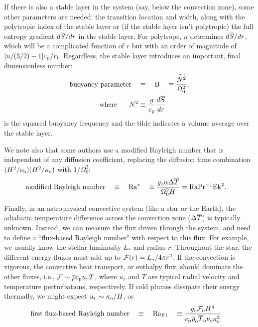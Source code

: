 \documentclass[12pt]{article} %
\begin{document}
If there is also a stable layer in the system (say, below the convection zone), some other parameters are needed: the transition location and width, along with the polytropic index of the stable layer or (if the stable layer isn't polytropic) the full entropy gradient $d\overline{S}/dr$ in the stable layer. For polytrope, $n$ determines $d\overline{S}/dr$, which will be a complicated function of $r$ but with an order of magnitude of $[n/(3/2)-1]c_{\rm{p}}/r_{\rm{i}}$. Regardless, the stable layer introduces an important, final dimensionless number:
\begin{align}
	\text{buoyancy parameter}\quad & \equiv \quad {\rm{B}} \quad \equiv \frac{\widetilde{N^2}}{\Omega_0^2},\\
	\text{where}\ \ \ \ \  N^2 &\equiv \frac{g}{c_{\rm{p}}}\frac{d\overline{S}}{dr}
\end{align}
is the squared buoyancy frequency and the tilde indicates a volume average over the stable layer. 

We note also that some authors use a modified Rayleigh number that is independent of any diffusion coefficient, replacing the diffusion time combination $(H^2/\nu_{\rm{o}})(H^2/\kappa_{\rm{o}})$ with $1/\Omega_0^2$:
\begin{align}
		\text{modified Rayleigh number} \quad & \equiv \quad {\rm{Ra^*}} \quad \equiv \frac{g_{\rm{o}}\alpha\Delta\overline{T} }{\Omega_0^2H}=\rm{Ra Pr^{-1} Ek^2}.
\end{align}

Finally, in an astrophysical convective system (like a star or the Earth), the adiabatic temperature difference across the convection zone ($\Delta\overline{T}$) is typically unknown. Instead, we can measure the flux driven through the system, and need to define a ``flux-based Rayleigh number" with respect to this flux. For example, we usually know the stellar luminosity $L_*$ and radius $r$. Throughout the star, the different energy fluxes must add up to ${\mathcal{F}}(r)=L_*/4\pi r^2$. If the convection is vigorous, the convective heat transport, or enthalpy flux, should dominate the other fluxes, i.e., ${\mathcal{F}}\sim\overline{\rho}c_{\rm{p}} u_rT$, where $u_r$ and $T$ are typical radial velocity and temperature perturbations, respectively. If cold plumes dissipate their energy thermally, we might expect $u_r\sim\kappa_{\rm{o}}/H$, or 
\begin{align}
	\text{first flux-based Rayleigh number} \quad & \equiv \quad {\rm{Ra_{F1}}} \quad \equiv \frac{g_{\rm{o}}{\mathcal{F}}_{\rm{o}} H^4}{c_{\rm{p}}\overline{\rho}_{\rm{o}}\overline{T}_{\rm{o}}\nu_{\rm{o}}\kappa_{\rm{o}}^2}
\end{align}
\end{document}

